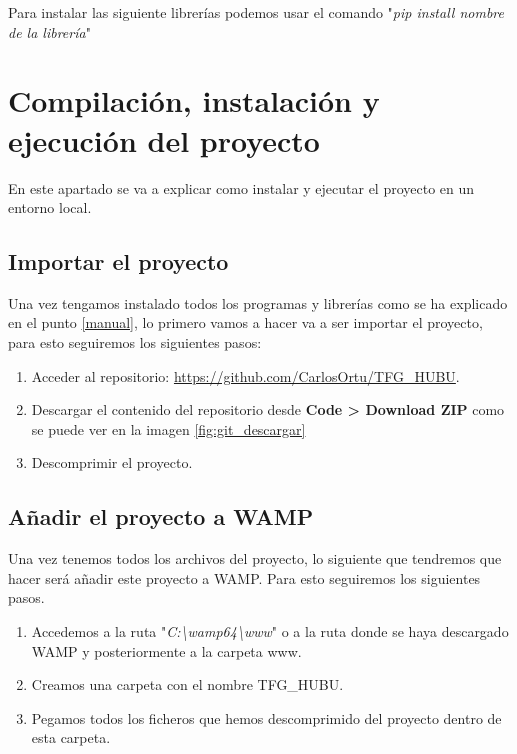 Para instalar las siguiente librerías podemos usar el comando "\textit{pip install nombre de la librería}"


\section{Compilación, instalación y ejecución del proyecto}

En este apartado se va a explicar como instalar y ejecutar el proyecto en un entorno local.

\subsection{Importar el proyecto}

Una vez tengamos instalado todos los programas y librerías como se ha explicado en el punto \ref{manual}, lo primero vamos a hacer va a ser importar el proyecto, para esto seguiremos los siguientes pasos:

\begin{enumerate}
    \item Acceder al repositorio: \href{https://github.com/CarlosOrtu/TFG_HUBU}{https://github.com/CarlosOrtu/TFG\_HUBU}.
    \item Descargar el contenido del repositorio desde \textbf{Code > Download ZIP} como se puede ver en la imagen \ref{fig:git_descargar}
    \item Descomprimir el proyecto.
\end{enumerate}
    
\subsection{Añadir el proyecto a WAMP}

Una vez tenemos todos los archivos del proyecto, lo siguiente que tendremos que hacer será añadir este proyecto a WAMP. Para esto seguiremos los siguientes pasos.

\begin{enumerate}
    \item Accedemos a la ruta "\textit{C:\textbackslash{}wamp64\textbackslash{}www}"{} o a la ruta donde se haya descargado WAMP y posteriormente a la carpeta www.
    \item Creamos una carpeta con el nombre TFG\_HUBU.
    \item Pegamos todos los ficheros que hemos descomprimido del proyecto dentro de esta carpeta.
\end{enumerate}

